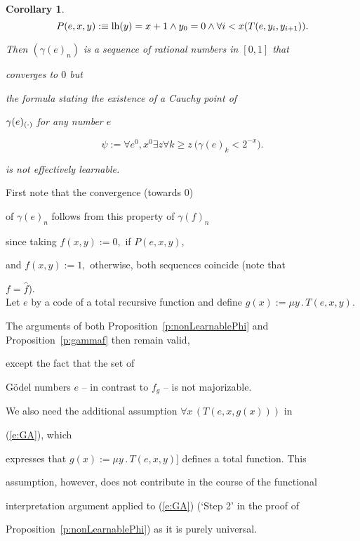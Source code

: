 \documentclass[1p]{elsarticle}
\theoremstyle{plain}
\newtheorem{cor}[thm]{Corollary}
\theoremstyle{definition}
\theoremstyle{remark}
\renewenvironment{proof}[1][]{\noindent{\bf Proof{#1}. }}{\nopagebreak[4]{\hspace*{\fill}


  $\Box$              %

 }{\vspace{2ex}}}
\theoremstyle{definition}
\begin{document}
{\begin{cor}
\[ P(e,x,y):\equiv \mbox{\rm lh} (y)=x+1\wedge y_0=0\wedge\forall i<x(T(e,y_i,y_{i+1})).\]  

Then $(\gamma(e)_n)$ is a sequence of rational numbers in $[0,1]$ that 

converges to $0$ but 

the formula stating the existence of a Cauchy point of 

$\gamma(e)_{(\cdot)}$ for any number $e$  

\[

\psi:=\forall e^0,x^0\exists z \forall k\geq z\ \big( \gamma(e)_k<2^{-x} \big).

\]

is not effectively learnable.

\end{cor}



\begin{proof}

First note that the convergence (towards $0$) 

of $\gamma(e)_n$ follows from this property of $\gamma(f)_n$ 

since taking $f(x,y):=0,$ if $P(e,x,y)$, 

and $f(x,y):=1,$ otherwise, both sequences coincide (note that 

$f=\widehat{f}$).\\ 

Let $e$ by a code of a total recursive function and define $g(x):=\mu 

y\,.\,T(e,x,y).$

The arguments of both Proposition~\ref{p:nonLearnablePhi} and Proposition~\ref{p:gammaf} then remain valid,

except the fact that the set of 

G\"odel numbers $e$ -- in contrast to $f_g$  -- is not majorizable. 

We also need the additional assumption $\forall x\,(T(e,x,g(x)))$ in 

(\ref{e:GA}), which 

expresses that $g(x):=\mu y\,.\,T(e,x,y)]$ defines a total function. This 

assumption, however, does not contribute in the course of the functional 

interpretation argument applied to (\ref{e:GA}) (`Step 2' in the proof of 

Proposition~\ref{p:nonLearnablePhi}) as it is purely universal. 


\end{proof}}
\end{document}
